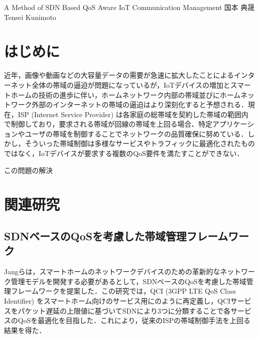 \documentclass[a4paper,10pt,twocolumn,uplatex]{jsarticle}
\date{13}
\begin{document}
{A Method of SDN Based QoS Aware IoT Communication Management}
{国本 典晟}
{Tensei Kunimoto}

\section{はじめに}
近年，画像や動画などの大容量データの需要が急速に拡大したことによるインターネット全体の帯域の逼迫が問題になっているが，IoTデバイスの増加とスマートホームの技術の進歩に伴い，ホームネットワーク内部の帯域並びにホームネットワーク外部のインターネットの帯域の逼迫はより深刻化すると予想される．現在，ISP (Internet Service Provider) は各家庭の総帯域を契約した帯域の範囲内で制御しており，要求される帯域が回線の帯域を上回る場合、特定アプリケーションやユーザの帯域を制御することでネットワークの品質確保に努めている\cite{guideline}．しかし，そういった帯域制御は多様なサービスやトラフィックに最適化されたものではなく，IoTデバイスが要求する複数のQoS要件を満たすことができない．\par
この問題の解決

\section{関連研究}

\subsection{SDNベースのQoSを考慮した帯域管理フレームワーク}
Jangらは，スマートホームのネットワークデバイスのための革新的なネットワーク管理モデルを開発する必要があるとして，SDNベースのQoSを考慮した帯域管理フレームワークを提案した\cite{framework}．この研究では，QCI (3GPP LTE QoS Class Identifier) をスマートホーム向けのサービス用にのように再定義し，QCIサービスをパケット遅延の上限値に基づいてSDNにより3つに分類することで各サービスのQoSを最適化を目指した．これにより，従来のISPの帯域制御手法を上回る結果を得た．\par
\end{document}
